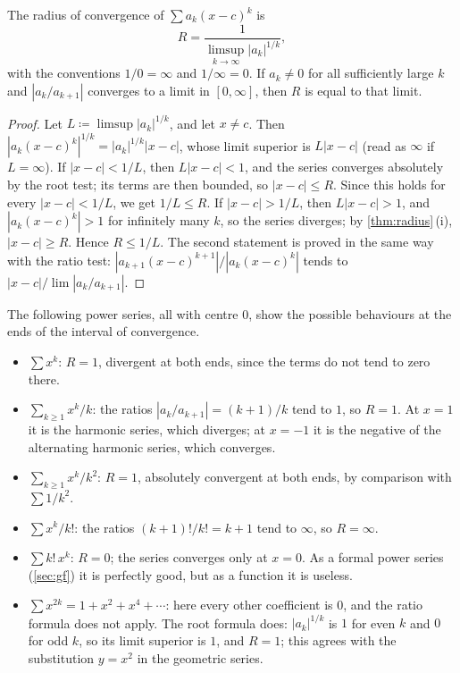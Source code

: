 \begin{theorem}
\label{thm:cauchy-hadamard}
The radius of convergence of $\sum a_k(x-c)^k$ is
\[
R=\frac1{\limsup_{k\to\infty}|a_k|^{1/k}},
\]
with the conventions $1/0=\infty$ and $1/\infty=0$. If $a_k\ne0$ for all sufficiently large $k$ and $|a_k/a_{k+1}|$ converges to a limit in $[0,\infty]$, then $R$ is equal to that limit.
\end{theorem}

\begin{proof}
Let $L\coloneqq\limsup|a_k|^{1/k}$, and let $x\ne c$. Then $|a_k(x-c)^k|^{1/k}=|a_k|^{1/k}|x-c|$, whose limit superior is $L|x-c|$ (read as $\infty$ if $L=\infty$). If $|x-c|<1/L$, then $L|x-c|<1$, and the series converges absolutely by the root test; its terms are then bounded, so $|x-c|\le R$. Since this holds for every $|x-c|<1/L$, we get $1/L\le R$. If $|x-c|>1/L$, then $L|x-c|>1$, and $|a_k(x-c)^k|>1$ for infinitely many $k$, so the series diverges; by \cref{thm:radius}\,(i), $|x-c|\ge R$. Hence $R\le1/L$. The second statement is proved in the same way with the ratio test: $|a_{k+1}(x-c)^{k+1}|/|a_k(x-c)^k|$ tends to $|x-c|/\lim|a_k/a_{k+1}|$.
\end{proof}

The following power series, all with centre $0$, show the possible behaviours at the ends of the interval of convergence.
\begin{itemize}
\item $\sum x^k$: $R=1$, divergent at both ends, since the terms do not tend to zero there.
\item $\sum_{k\ge1}x^k/k$: the ratios $|a_k/a_{k+1}|=(k+1)/k$ tend to $1$, so $R=1$. At $x=1$ it is the harmonic series, which diverges; at $x=-1$ it is the negative of the alternating harmonic series, which converges.
\item $\sum_{k\ge1}x^k/k^2$: $R=1$, absolutely convergent at both ends, by comparison with $\sum1/k^2$.
\item $\sum x^k/k!$: the ratios $(k+1)!/k!=k+1$ tend to $\infty$, so $R=\infty$.
\item $\sum k!\,x^k$: $R=0$; the series converges only at $x=0$. As a formal power series (\cref{sec:gf}) it is perfectly good, but as a function it is useless.
\item $\sum x^{2k}=1+x^2+x^4+\cdots$: here every other coefficient is $0$, and the ratio formula does not apply. The root formula does: $|a_k|^{1/k}$ is $1$ for even $k$ and $0$ for odd $k$, so its limit superior is $1$, and $R=1$; this agrees with the substitution $y=x^2$ in the geometric series.
\end{itemize}

